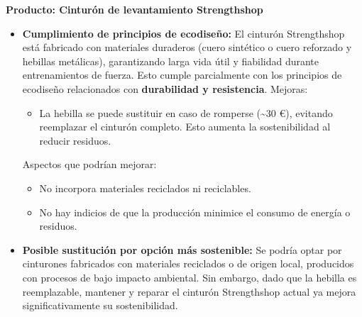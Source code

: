 


\begin{solution}
\textbf{Producto: Cinturón de levantamiento Strengthshop}

\begin{itemize}
    \item \textbf{Cumplimiento de principios de ecodiseño:}  
    El cinturón Strengthshop está fabricado con materiales duraderos (cuero sintético o cuero reforzado y hebillas metálicas), garantizando larga vida útil y fiabilidad durante entrenamientos de fuerza. Esto cumple parcialmente con los principios de ecodiseño relacionados con \textbf{durabilidad y resistencia}. Mejoras:
        \begin{itemize}
            \item La hebilla se puede sustituir en caso de romperse (\textasciitilde30 €), evitando reemplazar el cinturón completo. Esto aumenta la sostenibilidad al reducir residuos.
        \end{itemize}
    Aspectos que podrían mejorar:
        \begin{itemize}
            \item No incorpora materiales reciclados ni reciclables.
            \item No hay indicios de que la producción minimice el consumo de energía o residuos.
        \end{itemize}

    \item \textbf{Posible sustitución por opción más sostenible:}  
    Se podría optar por cinturones fabricados con materiales reciclados o de origen local, producidos con procesos de bajo impacto ambiental. Sin embargo, dado que la hebilla es reemplazable, mantener y reparar el cinturón Strengthshop actual ya mejora significativamente su sostenibilidad.
\end{itemize}
\end{solution}
